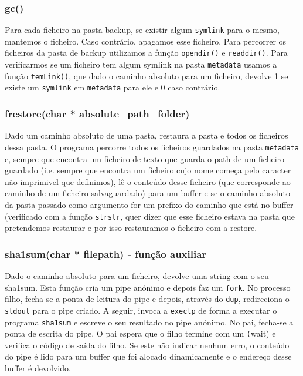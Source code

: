 \documentclass[a4paper,12pt,titlepage,portuguese]{article}
\begin{document}
\subsubsection{gc()}

Para cada ficheiro na pasta backup, se existir algum \texttt{symlink} para o mesmo, mantemos o ficheiro. Caso contrário, apagamos esse ficheiro. Para percorrer os ficheiros da pasta de backup utilizamos a função \texttt{opendir()} e \texttt{readdir()}. Para verificarmos se um ficheiro tem algum symlink na pasta \texttt{metadata} usamos a função \texttt{temLink()}, que dado o caminho absoluto para um ficheiro, devolve 1 se existe um \texttt{symlink} em \texttt{metadata} para ele e 0 caso contrário.

\subsubsection{frestore(char * absolute\_path\_folder)}

Dado um caminho absoluto de uma pasta, restaura a pasta e todos os ficheiros dessa pasta. 
O programa percorre todos os ficheiros guardados na pasta \texttt{metadata} e, sempre que encontra um ficheiro de texto que guarda o path de um ficheiro guardado (i.e. sempre que encontra um ficheiro cujo nome começa pelo caracter não imprimivel que definimos), lê o conteúdo desse ficheiro (que corresponde ao caminho de um ficheiro salvaguardado) para um buffer e se o caminho absoluto da pasta passado como argumento for um prefixo do caminho que está no buffer (verificado com a função \texttt{strstr}, quer dizer que esse ficheiro estava na pasta que pretendemos restaurar e por isso restauramos o ficheiro com a restore.

\subsubsection{ sha1sum(char * filepath) - função auxiliar}

Dado o caminho absoluto para um ficheiro, devolve uma string com o seu sha1sum. Esta função cria um pipe anónimo e depois faz um \texttt{fork}. No processo filho, fecha-se a ponta de leitura do pipe e depois, através do \texttt{dup}, redireciona o \texttt{stdout} para o pipe criado. A seguir, invoca a \texttt{execlp} de forma a executar o programa \texttt{sha1sum} e escreve o seu resultado no pipe anónimo. No pai, fecha-se a ponta de escrita do pipe. O pai espera que o filho termine com um \texttt(wait) e verifica o código de saída do filho. Se este não indicar nenhum erro, o conteúdo do pipe é lido para um buffer que foi alocado dinamicamente e o endereço desse buffer é devolvido.
\end{document}
